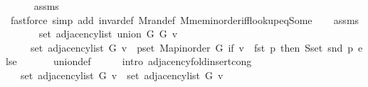 \begin{isabellebody}
\ \ \ \ \isamarkupfalse%
\ assms{\isacharparenleft}{\kern0pt}{}{\isacharparenright}{\kern0pt}\isanewline
\ \ \ \ \isamarkupfalse%
\ {\isacharparenleft}{\kern0pt}fastforce\ simp\ add{\isacharcolon}{\kern0pt}\ invar{\isacharunderscore}{\kern0pt}def\ M{\isachardot}{\kern0pt}ran{\isacharunderscore}{\kern0pt}def\ M{\isachardot}{\kern0pt}mem{\isacharunderscore}{\kern0pt}inorder{\isacharunderscore}{\kern0pt}iff{\isacharunderscore}{\kern0pt}lookup{\isacharunderscore}{\kern0pt}eq{\isacharunderscore}{\kern0pt}Some{\isacharparenright}{\kern0pt}\isanewline
\ \ \isamarkupfalse%
\ assms{\isacharparenleft}{\kern0pt}{}{\isacharparenright}{\kern0pt}\isanewline
\ \ \isamarkupfalse%
\isanewline
\ \ \ \ {\isachardoublequoteopen}set\ {\isacharparenleft}{\kern0pt}adjacency{\isacharunderscore}{\kern0pt}list\ {\isacharparenleft}{\kern0pt}union\ G{}\ G{}{\isacharparenright}{\kern0pt}\ v{\isacharparenright}{\kern0pt}\ {\isacharequal}{\kern0pt}\isanewline
\ \ \ \ \ set\ {\isacharparenleft}{\kern0pt}adjacency{\isacharunderscore}{\kern0pt}list\ G{}\ v{\isacharparenright}{\kern0pt}\ {\isasymunion}\ {\isacharparenleft}{\kern0pt}{\isasymUnion}p{\isasymin}set\ {\isacharparenleft}{\kern0pt}Map{\isacharunderscore}{\kern0pt}inorder\ G{}{\isacharparenright}{\kern0pt}{\isachardot}{\kern0pt}\ if\ v\ {\isacharequal}{\kern0pt}\ fst\ p\ then\ S{\isachardot}{\kern0pt}set\ {\isacharparenleft}{\kern0pt}snd\ p{\isacharparenright}{\kern0pt}\ else\ {\isacharbraceleft}{\kern0pt}{\isacharbraceright}{\kern0pt}{\isacharparenright}{\kern0pt}{\isachardoublequoteclose}\isanewline
\ \ \ \ \isamarkupfalse%
\ union{\isacharunderscore}{\kern0pt}def\isanewline
\ \ \ \ \isamarkupfalse%
\ {\isacharparenleft}{\kern0pt}intro\ adjacency{\isacharunderscore}{\kern0pt}fold{\isacharunderscore}{\kern0pt}insert{\isacharunderscore}{\kern0pt}{}{\isacharunderscore}{\kern0pt}cong{\isacharparenright}{\kern0pt}\isanewline
\ \ \isamarkupfalse%
\ \isamarkupfalse%
\ {\isachardoublequoteopen}{\isachardot}{\kern0pt}{\isachardot}{\kern0pt}{\isachardot}{\kern0pt}\ {\isacharequal}{\kern0pt}\ set\ {\isacharparenleft}{\kern0pt}adjacency{\isacharunderscore}{\kern0pt}list\ G{}\ v{\isacharparenright}{\kern0pt}\ {\isasymunion}\ set\ {\isacharparenleft}{\kern0pt}adjacency{\isacharunderscore}{\kern0pt}list\ G{}\ v{\isacharparenright}{\kern0pt}{\isachardoublequoteclose}\isanewline
\ \ \ \ \isamarkupfalse%

\end{isabellebody}
